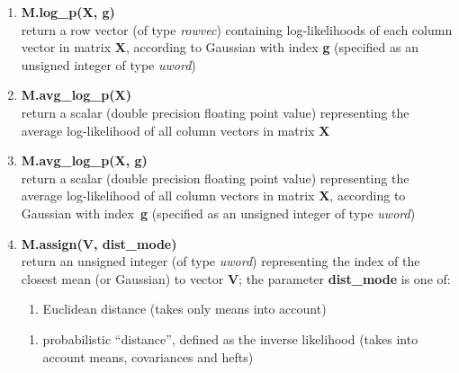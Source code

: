 \begin{enumerate}[{$\bullet$}]
\item
{\bf M.log\_p(X, g)}\\
return a row vector (of type {\it rowvec}) containing log-likelihoods of each column vector in matrix {\bf X},
according to Gaussian with index {\bf g}  (specified as an unsigned integer of type {\it uword})

\item
{\bf M.avg\_log\_p(X)}\\
return a scalar (double precision floating point value) representing the average log-likelihood of all column vectors in matrix {\bf X}

\item
{\bf M.avg\_log\_p(X, g)}\\
return a scalar (double precision floating point value) representing the average log-likelihood of all column vectors in matrix {\bf X},
according to Gaussian with index~{\bf g}  (specified as an unsigned integer of type {\it uword})

\item
{\bf M.assign(V, dist\_mode)}\\
return an unsigned integer (of type {\it uword}) representing the index of the
closest mean (or Gaussian) to vector {\bf V}; the parameter {\bf dist\_mode} is one
of:
\begin{small}
\begin{enumerate}
\item
Euclidean distance (takes only means into account)
\end{enumerate}

\begin{enumerate}
\item
probabilistic ``distance'', defined as the inverse likelihood (takes into account means, covariances and hefts)
\end{enumerate}
\end{small}



\end{enumerate}
